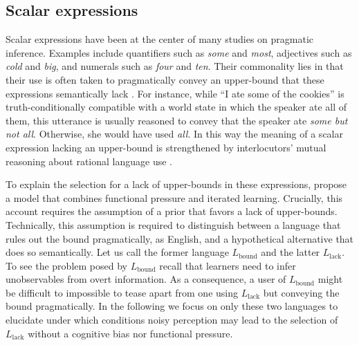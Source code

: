 \documentclass[10pt,a4paper]{article}
\begin{document}
\subsection{Scalar expressions}
Scalar expressions have been at the center of many studies on pragmatic inference. Examples
include quantifiers such as {\em some} and {\em most}, adjectives such as {\em cold} and {\em
  big}, and numerals such as {\em four} and {\em ten}. Their commonality lies in that
their use is often taken to pragmatically convey an upper-bound that these expressions
semantically lack \citep{horn:1972,gazdar:1979}. For instance, while ``I ate some of the
  cookies'' is truth-conditionally compatible with a world state in which the speaker ate
all of them, this utterance is usually reasoned to convey that the speaker ate {\em some but
  not all}. Otherwise, she would have used {\em all}. In this way the
meaning of a scalar expression lacking an upper-bound is strengthened by interlocutors' mutual reasoning
about rational language use \citep{grice:1975}.

To explain the selection for a lack of upper-bounds in these expressions, \citet{brochhagen+etal:2016:CogSci} propose a model that combines functional pressure and iterated learning.  Crucially, this account requires the assumption of a prior that favors a lack of upper-bounds. Technically, this assumption is required to distinguish between a language that rules out the bound pragmatically, as English, and a hypothetical alternative that does so semantically. Let us call the former language $L_{\text{bound}}$ and the latter $L_{\text{lack}}$. To see the problem posed by $L_{\text{bound}}$ recall that learners need to infer unobservables from overt information. As a consequence, a user of $L_{\text{bound}}$ might be difficult to impossible to tease apart from one using $L_{\text{lack}}$ but conveying the bound pragmatically. In the following we focus on only these two languages to elucidate under which conditions noisy perception may lead to the selection of $L_{\text{lack}}$ without a cognitive bias nor functional pressure.
\end{document}
